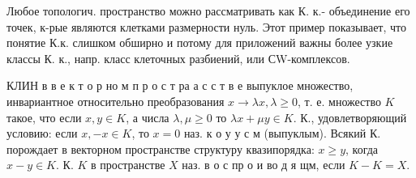 \documentclass[10pt]{article}
\begin{document}
Любое топологич. пространство можно рассматривать как К. к.- объединение его точек, к-рые являются клетками размерности нуль. Этот пример показывает, что понятие К.к. слишком обширно и потому для приложений важны более узкие классы К. к., напр. класс клеточных разбиений, или СW-комплексов.



КЛИН в в е к т о р но м п р о с т ра а с с т в е выпуклое множество, инвариантное относительно преобразования $x \rightarrow \lambda x, \lambda \geqslant 0$, т. е. множество $K$ такое, что если $x, y \in K$, а числа $\lambda, \mu \geqslant 0$ то $\lambda x+\mu y \in K$. К., удовлетворяющий условию: если $x,-x \in K$, то $x=0$ наз. к о у у с м (выпуклым). Всякий К. порождает в векторном пространстве структуру квазипорядка: $x \geqslant y$, когда $x-y \in K$. К. $K$ в пространстве $X$ наз. в о с пр о и во д я щм, если $K-K=X$.
\end{document}
